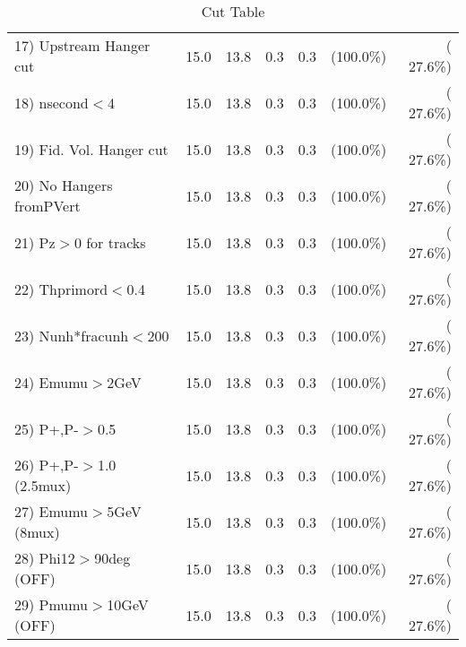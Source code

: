 \begin{table}[h!]
\begin{tabular}{||l||r|r|r|r|r|r||}
 17) Upstream Hanger cut  &         15.0 &         13.8 &          0.3 &          0.3 & (100.0\%) & ( 27.6\%) \\
 18) nsecond$<$4          &         15.0 &         13.8 &          0.3 &          0.3 & (100.0\%) & ( 27.6\%) \\
 19) Fid. Vol. Hanger cut &         15.0 &         13.8 &          0.3 &          0.3 & (100.0\%) & ( 27.6\%) \\
 20) No Hangers fromPVert &         15.0 &         13.8 &          0.3 &          0.3 & (100.0\%) & ( 27.6\%) \\
 21) Pz$>$0 for tracks    &         15.0 &         13.8 &          0.3 &          0.3 & (100.0\%) & ( 27.6\%) \\
 22) Thprimord$<$0.4      &         15.0 &         13.8 &          0.3 &          0.3 & (100.0\%) & ( 27.6\%) \\
 23) Nunh*fracunh$<$200   &         15.0 &         13.8 &          0.3 &          0.3 & (100.0\%) & ( 27.6\%) \\
 24) Emumu$>$2GeV         &         15.0 &         13.8 &          0.3 &          0.3 & (100.0\%) & ( 27.6\%) \\
 25) P+,P-$>$0.5          &         15.0 &         13.8 &          0.3 &          0.3 & (100.0\%) & ( 27.6\%) \\
 26) P+,P-$>$1.0 (2.5mux) &         15.0 &         13.8 &          0.3 &          0.3 & (100.0\%) & ( 27.6\%) \\
 27) Emumu$>$5GeV  (8mux) &         15.0 &         13.8 &          0.3 &          0.3 & (100.0\%) & ( 27.6\%) \\
 28) Phi12$>$90deg  (OFF) &         15.0 &         13.8 &          0.3 &          0.3 & (100.0\%) & ( 27.6\%) \\
 29) Pmumu$>$10GeV  (OFF) &         15.0 &         13.8 &          0.3 &          0.3 & (100.0\%) & ( 27.6\%) \\
 \hline
 \hline
 \end{tabular}
 \caption{Cut Table           }
 \label{tab-cutheavy_neutrino_1.000}
 \end{table}
